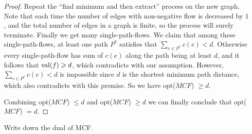 \begin{proof}
        Repeat the ``find minimum and then extract'' process on the new graph. Note that each time the number of edges with non-negative flow is decreased by $1$, and the total number of edges in a graph is finite, so the process will surely terminate. Finally we get many single-path-flows. We claim that among these single-path-flows, at least one path $P^*$ satisfies that $\sum_{e \in P^*} c(e) < d$. Otherwise every single-path-flow has sum of $c(e)$ along the path being at least $d$, and it follows that ${\rm val}(f) \geqslant d$, which contradicts with our assumption. However, $\sum_{e \in P^*} c(e) < d$ is impossible since $d$ is the shortest minimum path distance, which also contradicts with this premise. So we have opt($MCF$) $\geqslant d$.
        
        \bigskip
        
        Combining opt($MCF$) $\leqslant d$ and opt($MCF$) $\geqslant d$ we can finally conclude that opt($MCF$) $= d$.
    \end{proof}

    \newpage
    
    \begin{thm}{}{}
        Write down the dual of MCF. 
    \end{thm}
    
